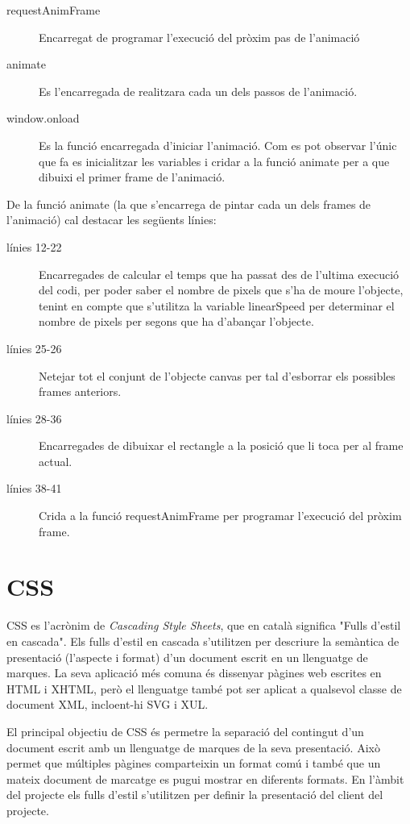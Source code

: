 \begin{description}
    \item[requestAnimFrame]{ Encarregat de programar l'execució del pròxim pas de l'animació}
    \item[animate]{ Es l'encarregada de realitzara cada un dels passos de l'animació.}
    \item[window.onload] { Es la funció encarregada d'iniciar l'animació. Com es pot observar l'únic que fa es inicialitzar les variables i cridar a la funció animate per a que dibuixi el primer frame de l'animació.}
\end{description}

De la funció animate (la que s'encarrega de pintar cada un dels frames de l'animació) cal destacar les següents línies:

\begin{description}
    \item[línies 12-22] {Encarregades de calcular el temps que ha passat des de l'ultima execució del codi, per poder saber el nombre de pixels que s'ha de moure l'objecte, tenint en compte que s'utilitza la variable linearSpeed per determinar el nombre de pixels per segons que ha d'abançar l'objecte.}
    \item[línies 25-26] {Netejar tot el conjunt de l'objecte canvas per tal d'esborrar els possibles frames anteriors.}
    \item[línies 28-36] {Encarregades de dibuixar el rectangle a la posició que li toca per al frame actual.}
    \item[línies 38-41] {Crida a la funció requestAnimFrame per programar l'execució del pròxim frame.}
\end{description} 


\section{CSS}

CSS es l'acrònim de \emph{Cascading Style Sheets}, que en català significa "Fulls d'estil en cascada". Els fulls d'estil en cascada s'utilitzen per descriure la semàntica de presentació (l'aspecte i format) d'un document escrit en un llenguatge de marques. La seva aplicació més comuna és dissenyar pàgines web escrites en HTML i XHTML, però el llenguatge també pot ser aplicat a qualsevol classe de document XML, incloent-hi SVG i XUL.

El principal objectiu de CSS és permetre la separació del contingut d'un document escrit amb un llenguatge de marques de la seva presentació. Això permet que múltiples pàgines comparteixin un format comú i també que un mateix document de marcatge es pugui mostrar en diferents formats. En l'àmbit del projecte els fulls d'estil s'utilitzen per definir la presentació del client del projecte.

